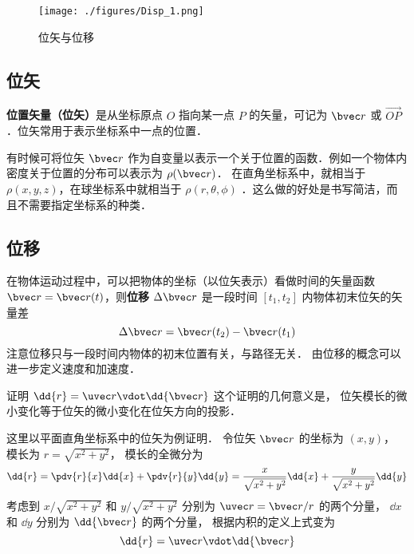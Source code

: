 

\begin{figure}[ht]
\centering
\texttt{[image: ./figures/Disp\_1.png]}
\caption{位矢与位移} \label{Disp_fig1}
\end{figure}

\subsection{位矢}

\textbf{位置矢量（位矢）}是从坐标原点 $O$ 指向某一点 $P$ 的矢量，可记为 $\bvec r$ 或 $\overrightarrow{OP}$．位矢常用于表示坐标系中一点的位置．

有时候可将位矢 $\bvec r$ 作为自变量以表示一个关于位置的函数．例如一个物体内密度关于位置的分布可以表示为 $\rho(\bvec r)$． 在直角坐标系中，就相当于 $\rho(x,y,z)$，在球坐标系中就相当于 $\rho(r,\theta,\phi)$ ．这么做的好处是书写简洁，而且不需要指定坐标系的种类．

\subsection{位移}
在物体运动过程中，可以把物体的坐标（以位矢表示）看做时间的矢量函数 $\bvec r=\bvec r(t)$，则\textbf{位移} $\Delta \bvec r$ 是一段时间 $[t_1,t_2]$ 内物体初末位矢的矢量差
\begin{equation}
\Delta \bvec r = \bvec r(t_2) - \bvec r(t_1)
\end{equation}
注意位移只与一段时间内物体的初末位置有关，与路径无关． 由位移的概念可以进一步定义速度和加速度．


\begin{example}{证明 $\dd{r} = \uvec r \vdot \dd{\bvec r}$}\label{Disp_ex1}
这个证明的几何意义是， 位矢模长的微小变化等于位矢的微小变化在位矢方向的投影．

这里以平面直角坐标系中的位矢为例证明． 令位矢 $\bvec r$ 的坐标为 $(x, y)$， 模长为 $r = \sqrt{x^2 + y^2}$，
模长的全微分为
\begin{equation}
\dd{r} = \pdv{r}{x} \dd{x} + \pdv{r}{y} \dd{y} = \frac{x}{\sqrt{x^2 + y^2}} \dd{x} + \frac{y}{\sqrt{x^2 + y^2}} \dd{y}
\end{equation}
考虑到 $x/\sqrt{x^2 + y^2}$ 和 $y/\sqrt{x^2 + y^2}$ 分别为 $\uvec r = \bvec r/r$ 的两个分量， $\dd{x}$ 和 $\dd{y}$ 分别为 $\dd{\bvec r}$ 的两个分量， 根据内积的定义上式变为
\begin{equation}
\dd{r} = \uvec r \vdot \dd{\bvec r}
\end{equation}
\end{example}
